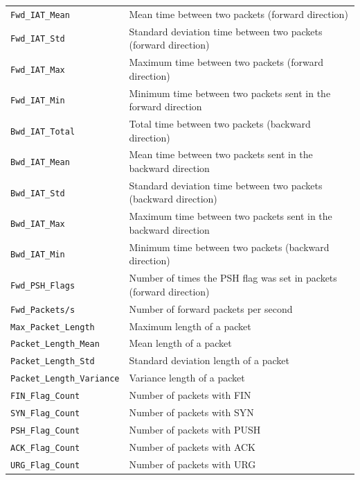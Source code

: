 \begin{table}[h!]
\begin{tabular}{l|l}
        \rowcolor{black!10} \texttt{Fwd\_IAT\_Mean} & Mean time between two packets (forward direction) \\
        \texttt{Fwd\_IAT\_Std} & Standard deviation time between two packets (forward direction) \\
        \rowcolor{black!10} \texttt{Fwd\_IAT\_Max} & Maximum time between two packets (forward direction) \\
        \texttt{Fwd\_IAT\_Min} & Minimum time between two packets sent in the forward direction \\
        \rowcolor{black!10} \texttt{Bwd\_IAT\_Total} & Total time between two packets (backward direction) \\
        \texttt{Bwd\_IAT\_Mean} & Mean time between two packets sent in the backward direction \\
        \rowcolor{black!10} \texttt{Bwd\_IAT\_Std} & Standard deviation time between two packets (backward direction) \\
        \texttt{Bwd\_IAT\_Max} & Maximum time between two packets sent in the backward direction \\
        \rowcolor{black!10} \texttt{Bwd\_IAT\_Min} & Minimum time between two packets (backward direction) \\
        \texttt{Fwd\_PSH\_Flags} & Number of times the PSH flag was set in packets (forward direction) \\
        \rowcolor{black!10} \texttt{Fwd\_Packets/s} & Number of forward packets per second \\
        \texttt{Max\_Packet\_Length} & Maximum length of a packet \\
        \rowcolor{black!10} \texttt{Packet\_Length\_Mean} & Mean length of a packet \\
        \texttt{Packet\_Length\_Std} & Standard deviation length of a packet \\
        \rowcolor{black!10} \texttt{Packet\_Length\_Variance} & Variance length of a packet \\
        \texttt{FIN\_Flag\_Count} & Number of packets with FIN \\
        \rowcolor{black!10} \texttt{SYN\_Flag\_Count} & Number of packets with SYN \\
        \texttt{PSH\_Flag\_Count} & Number of packets with PUSH \\
        \rowcolor{black!10} \texttt{ACK\_Flag\_Count} & Number of packets with ACK \\
        \texttt{URG\_Flag\_Count} & Number of packets with URG \\

\end{tabular}
\end{table}
